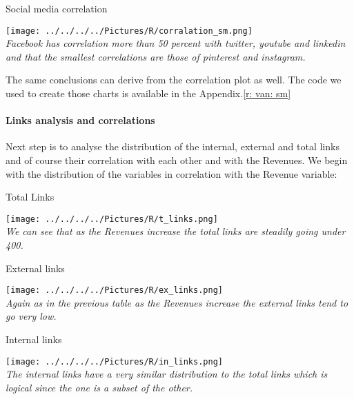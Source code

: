 \documentclass{article}
\begin{document}
\begin{table}[H]
\centering
\caption{Social media correlation}
\begin{center}
\texttt{[image: ../../../../Pictures/R/corralation\_sm.png]}  \\
\textit{Facebook has correlation more than 50 percent with twitter, youtube and linkedin and that the smallest correlations are those of pinterest and instagram.}
\end{center}
\end{table}

The same conclusions can derive from the correlation plot as well. The code we used to create those charts is available in the Appendix.\ref{r: van: sm}
\paragraph{Links analysis and correlations}
Next step is to analyse the distribution of the internal, external and total links and of course their correlation with each other and with the Revenues. We begin with the distribution of the variables in correlation with the Revenue variable:

\begin{table}[H]
\centering
\caption{Total Links}
\begin{center}
\texttt{[image: ../../../../Pictures/R/t\_links.png]}  \\
\textit{We can see that as the Revenues increase the total links are steadily going under 400.}
\end{center}
\end{table}

\begin{table}[H]
\centering
\caption{External links}
\begin{center}
\texttt{[image: ../../../../Pictures/R/ex\_links.png]}  \\
\textit{Again as in the previous table as the Revenues increase the external links tend to go very low.}
\end{center}
\end{table}

\begin{table}[H]
\centering
\caption{Internal links}
\begin{center}
\texttt{[image: ../../../../Pictures/R/in\_links.png]}  \\
\textit{The internal links have a very similar distribution to the total links which is logical since the one is a subset of the other.}
\end{center}
\end{table}
\end{document}
